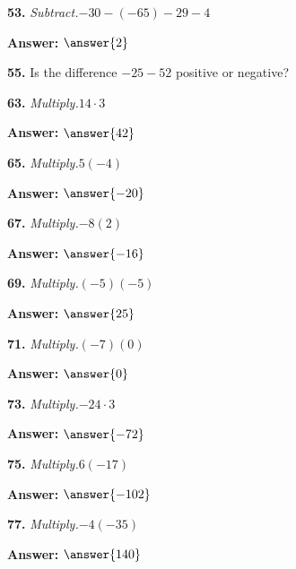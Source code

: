 \documentclass{ximera}
\begin{document}
\begin{problem}
\textbf{53.} \emph{Subtract.}\quad $-30 - (-65) - 29 - 4$

\textbf{Answer:} $\answer{2}$
\end{problem}

\begin{problem}
\textbf{55.} Is the difference $-25 - 52$ positive or negative?

\begin{multipleChoice}
\end{multipleChoice}
\end{problem}

\begin{problem}
\textbf{63.} \emph{Multiply.}\quad $14 \cdot 3$

\textbf{Answer:} $\answer{42}$
\end{problem}

\begin{problem}
\textbf{65.} \emph{Multiply.}\quad $5(-4)$

\textbf{Answer:} $\answer{-20}$
\end{problem}

\begin{problem}
\textbf{67.} \emph{Multiply.}\quad $-8(2)$

\textbf{Answer:} $\answer{-16}$
\end{problem}

\begin{problem}
\textbf{69.} \emph{Multiply.}\quad $(-5)(-5)$

\textbf{Answer:} $\answer{25}$
\end{problem}

\begin{problem}
\textbf{71.} \emph{Multiply.}\quad $(-7)(0)$

\textbf{Answer:} $\answer{0}$
\end{problem}

\begin{problem}
\textbf{73.} \emph{Multiply.}\quad $-24 \cdot 3$

\textbf{Answer:} $\answer{-72}$
\end{problem}

\begin{problem}
\textbf{75.} \emph{Multiply.}\quad $6(-17)$

\textbf{Answer:} $\answer{-102}$
\end{problem}

\begin{problem}
\textbf{77.} \emph{Multiply.}\quad $-4(-35)$

\textbf{Answer:} $\answer{140}$
\end{problem}
\end{document}
